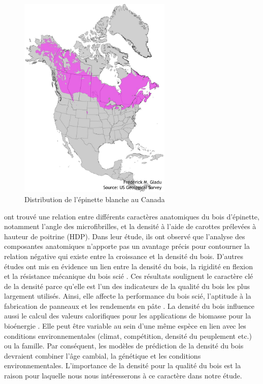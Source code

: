 \documentclass[a4paper,12pt]{report}
\begin{document}
\begin{figure}
	
	\centering
	\includegraphics[width=0.65\textwidth]{distribution.jpg}
	\caption{Distribution de l'épinette blanche au Canada}
	\label{fig:distribution}
	
	
\end{figure}


\cite{Ivkovich2002} ont trouvé une relation entre différents caractères anatomiques du bois d'épinette, notamment l'angle des microfibrilles, et la densité à l'aide de carottes prélevées à hauteur de poitrine (HDP). Dans leur étude, ils ont observé que l'analyse des composantes anatomiques n'apporte pas un avantage précis pour contourner la relation négative qui existe entre la croissance et la densité du bois. D'autres études ont mis en évidence un lien entre la densité du bois, la rigidité en flexion et la résistance mécanique du bois scié \citep{Saranpaa1994,Alteyrac2006}. Ces résultats soulignent le caractère clé de la densité parce qu'elle est l'un des indicateurs de la qualité du bois les plus largement utilisés. Ainsi, elle affecte la performance du bois scié, l'aptitude à la fabrication de panneaux et les rendements en pâte \citep{Macdonald2002}. La densité du bois influence aussi le calcul des valeurs calorifiques pour les applications de biomasse pour la bioénergie \citep{Mckendry2002}. Elle peut être variable au sein d'une même espèce en lien avec les conditions environnementales (climat, compétition, densité du peuplement etc.) ou la famille. Par conséquent, les modèles de prédiction de la densité du bois devraient combiner l'âge cambial, la génétique et les conditions environnementales. L'importance de la densité pour la qualité du bois est la raison pour laquelle nous nous intéresserons à ce caractère dans notre étude. \\
\end{document}
